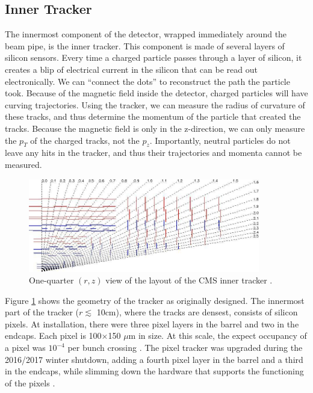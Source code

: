 \subsection{Inner Tracker}
\label{ssec:cms:components:tracker}

The innermost component of the detector, wrapped immediately around
the beam pipe, is the inner tracker. This component is made of several
layers of silicon sensors. Every time a charged
particle passes through a layer of silicon, it creates a blip of
electrical current in the silicon that can be read out
electronically. We can ``connect the dots'' to reconstruct the path
the particle took. Because of the magnetic field inside the detector,
charged particles will have curving trajectories. Using the tracker,
we can measure the radius of curvature of these tracks, and thus
determine the momentum of the particle that created the
tracks. Because the magnetic field is only in the z-direction, we can
only measure the $p_T$ of the charged tracks, not the
$p_z$. Importantly, neutral particles do not leave any hits in the
tracker, and thus their trajectories and momenta cannot be measured.

\begin{figure}[htb]
\centering
\includegraphics[width=0.9\textwidth]{figures/tracker.jpg}
\caption[One-quarter $(r,z)$ view of the layout of the CMS inner
tracker.]{One-quarter $(r,z)$ view of the layout of the CMS inner tracker \cite{tdr}.}
\label{fig:cms:tracker}
\end{figure}

Figure \ref{fig:cms:tracker} shows the geometry of the tracker as originally designed.
The innermost part of the tracker ($r \lesssim$ 10cm), where the tracks are densest,
consists of silicon pixels. At installation, there were three pixel
layers in the barrel and two in the endcaps. Each pixel is
100$\times$150 $\mu$m in size. At this scale, the expect occupancy of
a pixel was $10^{-4}$ per bunch crossing \cite{tdr}. The pixel tracker
was upgraded during the 2016/2017 winter shutdown, adding a fourth
pixel layer in the barrel and a third in the endcaps, while slimming
down the hardware that supports the functioning of the pixels
\cite{pixeltdr}.

